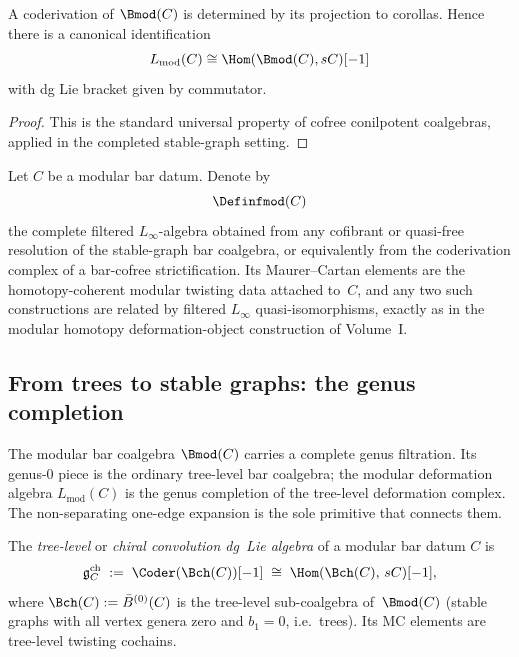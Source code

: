 \begin{proposition}
A coderivation of $\Bmod(C)$ is determined by its projection to corollas. Hence there is
a canonical identification
\[
L_{\mathrm{mod}}(C)\cong \Hom(\Bmod(C),sC)[-1]
\]
with dg Lie bracket given by commutator.
\end{proposition}

\begin{proof}
This is the standard universal property of cofree conilpotent coalgebras, applied in the
completed stable-graph setting.
\end{proof}

\begin{construction}
\label{const:vol2-homotopy-modular-object}
Let $C$ be a modular bar datum. Denote by
\[
\Definfmod(C)
\]
the complete filtered $L_\infty$-algebra obtained from any cofibrant or
quasi-free resolution of the stable-graph bar coalgebra, or equivalently
from the coderivation complex of a bar-cofree strictification. Its
Maurer--Cartan elements are the homotopy-coherent modular twisting data
attached to~$C$, and any two such constructions are related by filtered
$L_\infty$ quasi-isomorphisms, exactly as in the modular homotopy
deformation-object construction of Volume~I.
\end{construction}


\subsection{From trees to stable graphs: the genus completion}
\label{subsec:genus-completion}

The modular bar coalgebra $\Bmod(C)$ carries a complete
genus filtration. Its genus-$0$ piece is the ordinary
tree-level bar coalgebra; the modular deformation algebra
$L_{\mathrm{mod}}(C)$ is the genus completion of the
tree-level deformation complex. The non-separating one-edge
expansion is the sole primitive that connects them.

\begin{definition}
\label{def:chiral-convolution}
The \emph{tree-level} or \emph{chiral convolution dg~Lie algebra}
of a modular bar datum $C$ is
\begin{equation}\label{eq:chiral-convolution-dg-lie}
\mathfrak{g}^{\mathrm{ch}}_C
\;:=\;
\Coder(\Bch(C))[-1]
\;\cong\;
\Hom(\Bch(C),\, sC)[-1],
\end{equation}
where $\Bch(C) := \bar{B}^{(0)}(C)$ is the tree-level
sub-coalgebra of~$\Bmod(C)$ (stable graphs with all vertex
genera zero and $b_1 = 0$, i.e.\ trees). Its MC elements are
tree-level twisting cochains.
\end{definition}

